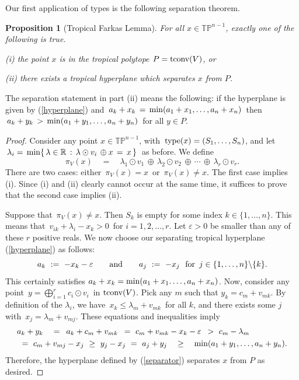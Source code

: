\documentclass[11pt]{amsart}
\newtheorem{prop}[thm]{Proposition}
\newcommand{\RR}{\mathbb{R}}
\newcommand{\TP}{\mathbb{TP}}
\begin{document}
Our first application of types is the following separation theorem.

\begin{prop}[Tropical Farkas Lemma]\label{farkas}
For all $x \in \TP^{n-1}$, exactly one of the following is true.

(i) the point $x$ is in the tropical polytope $P = {\rm tconv}(V)$, or

(ii) there exists a tropical hyperplane which separates $x$ from $P$.
\end{prop}

The separation statement in
part (ii) means the following: if the hyperplane
is given by  (\ref{hyperplane}) and
$\, a_k + x_k \, = \, {\rm min}(a_1+x_1,\ldots,a_n+x_n)\,$
then  $\,a_k + y_k \, > \,  {\rm min}(a_1+y_1,\ldots,a_n+y_n)\,$
for all $y \in P$.

\begin{proof}
Consider any point $x \in \TP^{n-1}$, with $\,
{\rm type}(x)=(S_1,\ldots,S_n)$,	
and let $\,\lambda_i
= \, {\rm min}\{ \, \lambda \in \RR \,
 : \, \lambda \odot v_i \, \oplus x \, = \, x \,\}\,$
as before.
We define
\begin{equation}
\label{nearestpointmap}
\pi_V(x) \quad = \quad \lambda_1 \odot v_1 \,
\oplus \, \lambda_2 \odot v_2 \, \oplus \,\cdots \, \oplus \,
\lambda_r \odot v_r  .
\end{equation}
There are two cases: either $\,\pi_V(x) = x \,$ or $\,\pi_V(x) \not= x$.
The first case implies (i). Since (i) and (ii) clearly cannot occur
at the same time, it suffices to prove that the second case implies (ii).

Suppose that $\,\pi_V(x) \not= x$. Then
$S_k$ is empty for some index $k \in \{1,\ldots,n\}$. This means that
 $\,v_{ik}+\lambda_i-x_k>0 \,$ for $i=1,2,\ldots,r$. Let
 $\varepsilon > 0$ be smaller than any of these $r$ positive reals.
We now choose our separating tropical hyperplane   (\ref{hyperplane}) as follows:
\begin{equation}
\label{separator}
a_k \,\, := \,\, - x_k - \varepsilon \qquad \hbox{and} \qquad
a_j \,\,:= \,\,-x_j \, \, \,\,\hbox{for} \,\,\, j \in \{1,\ldots,n\}\backslash \{k\}.
\end{equation}
This certainly satisfies $a_k+x_k = {\rm min}(a_1+x_1.\ldots,a_n+x_n)$.
Now, consider any point $\,y=\bigoplus_{i=1}^r c_i\odot v_i \,$
in ${\rm tconv}(V)$.  Pick any $m$ such that $y_k = c_m + v_{mk}$. By
definition of the $\lambda_i$,  we have 
$\,x_k \leq \lambda_m + v_{mk}\,$ for all $k$, 
and there exists some $j$ with
$\,x_j = \lambda_m + v_{mj}$. These equations
and inequalities imply
\begin{eqnarray*}
& a_k + y_k \quad
= \,\, \,
a_k + c_m + v_{mk} 
\,\ =  \,\,c_m + v_{mk} - x_k - \varepsilon 
\,\ >  \,\,   
 c_m - \lambda_m \\ &
\,\, = \,\,c_m + v_{mj} - x_j
\,\, \geq \,\, y_j-x_j 
\,\, = \,\, a_j+y_j
\quad \geq  \quad
{\rm min}(a_1+y_1,\ldots,a_n+y_n).
\end{eqnarray*}
 Therefore, the hyperplane defined by (\ref{separator}) separates $x$ from $P$ as desired.
\end{proof}
\end{document}
